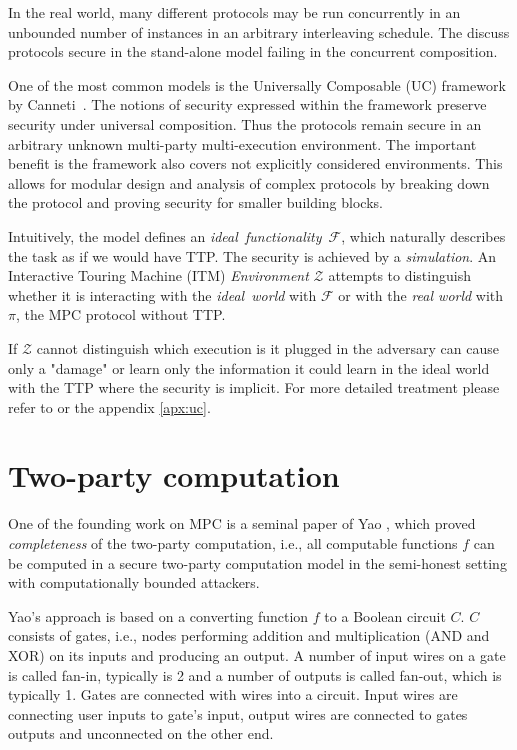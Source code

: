 \documentclass[
  digital, %
  twoside, %
  table,   %
  lof,     %
  lot,     %
]{fithesis3}
\theoremstyle{definition}
\theoremstyle{remark}
\begin{document}
In the real world, many different protocols may be run concurrently in an unbounded number of instances in an arbitrary interleaving schedule. The \cite{Can06, Can13} discuss protocols secure in the stand-alone model failing in the concurrent composition.

One of the most common models is the Universally Composable (UC) framework by Canneti~\cite{Can01}. The notions of security expressed within the framework preserve security under universal composition. Thus the protocols remain secure in an arbitrary unknown multi-party multi-execution environment. The important benefit is the framework also covers not explicitly considered environments. This allows for modular design and analysis of complex protocols by breaking down the protocol and proving security for smaller building blocks.

Intuitively, the model defines an \emph{ideal~functionality}~$\mathcal{F}$, which naturally describes the task as if we would have TTP. The security is achieved by a \emph{simulation}. An Interactive Touring Machine (ITM) \emph{Environment} $\mathcal{Z}$ attempts to distinguish whether it is interacting with the \emph{ideal~world} with $\mathcal{F}$ or with the \emph{real world} with $\pi$, the MPC protocol without TTP. 

If $\mathcal{Z}$ cannot distinguish which execution is it plugged in the adversary can cause only a "damage" or learn only the information it could learn in the ideal world with the TTP where the security is implicit. For more detailed treatment please refer to \cite{Can01, CLOS02, Lin03, G09, CDN15, Lin17} or the appendix \ref{apx:uc}.

\section{Two-party computation}\label{sec:soa:2pc} %
One of the founding work on MPC is a seminal paper of Yao \cite{Yao86}, which proved \emph{completeness} of the two-party computation, i.e., all computable functions $f$ can be computed in a secure two-party computation model in the semi-honest setting with computationally bounded attackers. 

Yao's approach is based on a converting function $f$ to a Boolean circuit $C$. $C$ consists of gates, i.e., nodes performing addition and multiplication (AND and XOR) on its inputs and producing an output. A number of input wires on a gate is called fan-in, typically is 2 and a number of outputs is called fan-out, which is typically 1. Gates are connected with wires into a circuit. Input wires are connecting user inputs to gate's input, output wires are connected to gates outputs and unconnected on the other end.
\end{document}

